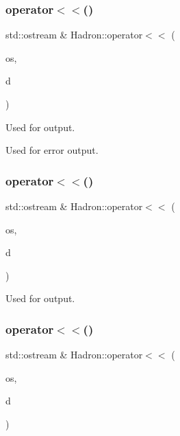 \subsubsection{\texorpdfstring{operator$<$$<$()}{operator<<()}\hspace{0.1cm}{\footnotesize\ttfamily [15/48]}}
{\footnotesize\ttfamily std\+::ostream \& Hadron\+::operator$<$$<$ (\begin{DoxyParamCaption}\item[{std\+::ostream \&}]{os,  }\item[{const \mbox{\hyperlink{structHadron_1_1KeyHadronNPartNPtCorr__t}{Key\+Hadron\+N\+Part\+N\+Pt\+Corr\+\_\+t}} \&}]{d }\end{DoxyParamCaption})}



Used for output. 

Used for error output. \mbox{\label{namespaceHadron_a84411155d0fadad0466230e8cdd0d17c}} 
\subsubsection{\texorpdfstring{operator$<$$<$()}{operator<<()}\hspace{0.1cm}{\footnotesize\ttfamily [16/48]}}
{\footnotesize\ttfamily std\+::ostream \& Hadron\+::operator$<$$<$ (\begin{DoxyParamCaption}\item[{std\+::ostream \&}]{os,  }\item[{const \mbox{\hyperlink{structHadron_1_1KeyHadronNPartIrrepOp__t_1_1CGPair__t}{Key\+Hadron\+N\+Part\+Irrep\+Op\+\_\+t\+::\+C\+G\+Pair\+\_\+t}} \&}]{d }\end{DoxyParamCaption})}



Used for output. 

\mbox{\label{namespaceHadron_a7fcec969c306a089eacf2f042ea60ba0}} 
\subsubsection{\texorpdfstring{operator$<$$<$()}{operator<<()}\hspace{0.1cm}{\footnotesize\ttfamily [17/48]}}
{\footnotesize\ttfamily std\+::ostream \& Hadron\+::operator$<$$<$ (\begin{DoxyParamCaption}\item[{std\+::ostream \&}]{os,  }\item[{const \mbox{\hyperlink{structHadron_1_1KeyHadronSUNNPartIrrepOp__t_1_1CGPair__t}{Key\+Hadron\+S\+U\+N\+N\+Part\+Irrep\+Op\+\_\+t\+::\+C\+G\+Pair\+\_\+t}} \&}]{d }\end{DoxyParamCaption})}



